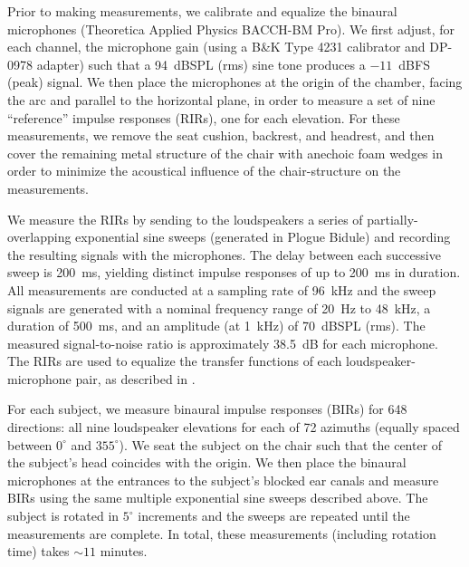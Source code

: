 Prior to making measurements, we calibrate and equalize the binaural microphones (Theoretica Applied Physics BACCH-BM Pro).
We first adjust, for each channel, the microphone gain (using a B\&K Type 4231 calibrator and DP-0978 adapter) such that a 94~dBSPL (rms) sine tone produces a $-11$~dBFS (peak) signal.
We then place the microphones at the origin of the chamber, facing the arc and parallel to the horizontal plane, in order to measure a set of nine ``reference'' impulse responses (RIRs), one for each elevation. %
For these measurements, we remove the seat cushion, backrest, and headrest, and then cover the remaining metal structure of the chair with anechoic foam wedges in order to minimize the acoustical influence of the chair-structure on the measurements.

We measure the RIRs by sending to the loudspeakers a series of partially-overlapping exponential sine sweeps \citep{Majdak2007} (generated in Plogue Bidule) and recording the resulting signals with the microphones. %
The delay between each successive sweep is 200~ms, yielding distinct impulse responses of up to 200~ms in duration.
All measurements are conducted at a sampling rate of 96~kHz and the sweep signals are generated with a nominal frequency range of 20~Hz to 48~kHz, a duration of 500~ms, and an amplitude (at 1~kHz) of 70~dBSPL (rms).
The measured signal-to-noise ratio is approximately 38.5~dB for each microphone.
The RIRs are used to equalize the transfer functions of each loudspeaker-microphone pair, as described in .

For each subject, we measure binaural impulse responses (BIRs) for 648 directions: all nine loudspeaker elevations for each of 72 azimuths (equally spaced between $0^\circ$ and $355^\circ$).
We seat the subject on the chair such that the center of the subject's head coincides with the origin.
We then place the binaural microphones at the entrances to the subject's blocked ear canals and measure BIRs using the same multiple exponential sine sweeps described above.
The subject is rotated in $5^{\circ}$ increments and the sweeps are repeated until the measurements are complete.
In total, these measurements (including rotation time) takes $\sim11$ minutes.